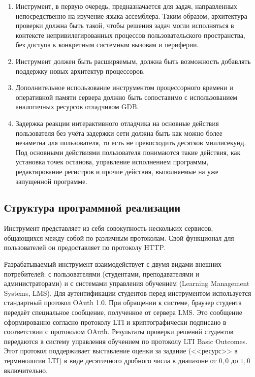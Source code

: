 \documentclass[a4paper,article,14pt]{extarticle}
\begin{document}
\begin{enumerate}
    \item Инструмент, в первую очередь, предназначается для задач, направленных непосредственно на изучение языка ассемблера. Таким образом, архитектура проверки должна быть такой, чтобы решения задач могли исполняться в контексте непривилегированных процессов пользовательского пространства, без доступа к конкретным системным вызовам и периферии.
    \item Инструмент должен быть расширяемым, должна быть возможность добавлять поддержку новых архитектур процессоров.
    \item Дополнительное использование инструментом процессорного времени и оперативной памяти сервера должно быть сопоставимо с использованием аналогичных ресурсов отладчиком GDB.
    \item Задержка реакции интерактивного отладчика на основные действия пользователя без учёта задержки сети должна быть как можно более незаметна для пользователя, то есть не превосходить десятков миллисекунд. Под основными действиями пользователя понимаются такие действия, как установка точек останова, управление исполнением программы, редактирование регистров и прочие действия, выполняемые на уже запущенной программе.
\end{enumerate}

\subsection{Структура программной реализации}

Инструмент представляет из себя совокупность нескольких сервисов, общающихся между собой по различным протоколам. Свой функционал для пользователей он предоставляет по протоколу HTTP.

Разрабатываемый инструмент взаимодействует с двумя видами внешних потребителей: с пользователями (студентами, преподавателями и администраторами) и с системами управления обучением (Learning Management Systems, LMS). Для аутентификации студентов перед инструментом используется стандартный протокол OAuth 1.0\cite{oauthrfc}. При обращении к системе, браузер студента передаёт специальное сообщение, полученное от сервера LMS. Это сообщение сформированно согласно протоколу LTI\cite{lti} и криптографически подписано в соответствии с протоколом OAuth. Результаты проверки решений студентов передаются в систему управления обучением по протоколу LTI Basic Outcomes\cite{ltioutcomes}. Этот протокол поддерживает выставление оценки за задание (<<ресурс>> в терминологии LTI) в виде десятичного дробного числа в диапазоне от $0{,}0$ до $1{,}0$ включительно.
\end{document}

